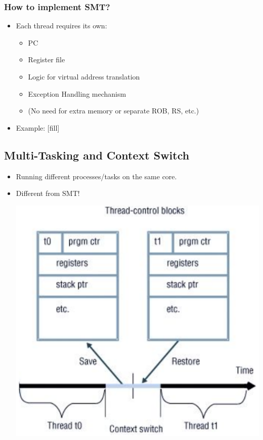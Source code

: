 \documentclass[10pt]{article}
\begin{document}
\subsubsection*{How to implement SMT?}
\begin{itemize}
    \item Each thread requires its own:
    \begin{itemize}
        \item PC
        \item Register file
        \item Logic for virtual address translation
        \item Exception Handling mechanism
        \item (No need for extra memory or separate ROB, RS, etc.)
    \end{itemize}
    \item Example:
    [fill]
\end{itemize}
\subsection*{Multi-Tasking and Context Switch}
\begin{itemize}
    \item Running different processes/tasks on the same core.
    \item Different from SMT!
    \begin{center}
        \includegraphics*[scale=0.6]{W8_2.png}
    \end{center}
\end{itemize}
\end{document}
